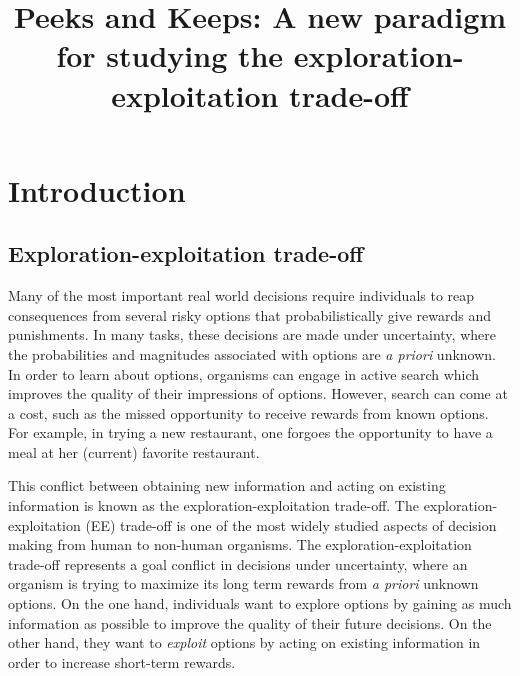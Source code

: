 \documentclass[a4paper,doc,natbib,floatsintext]{apa6}
\title{Peeks and Keeps: A new paradigm for studying the exploration-exploitation trade-off}
\begin{document}
\begin{knitrout}
\color{fgcolor}\begin{kframe}
\begin{alltt}
\hlstd{(} \hlstd{=} \hlstd{)}

 \hlkwb{<-} 
 \hlkwb{<-} 
\end{alltt}
\end{kframe}
\end{knitrout}



\maketitle

\section*{Introduction}

\subsection{Exploration-exploitation trade-off}

Many of the most important real world decisions require individuals to reap consequences from several risky options that probabilistically give rewards and punishments. In many tasks, these decisions are made under uncertainty, where the probabilities and magnitudes associated with options are \textit{a priori} unknown. In order to learn about options, organisms can engage in active search which improves the quality of their impressions of options. However, search can come at a cost, such as the missed opportunity to receive rewards from known options. For example, in trying a new restaurant, one forgoes the opportunity to have a meal at her (current) favorite restaurant.

This conflict between obtaining new information and acting on existing information is known as the exploration-exploitation trade-off. The exploration-exploitation (EE) trade-off is one of the most widely studied aspects of decision making from human to non-human organisms. The exploration-exploitation trade-off represents a goal conflict in decisions under uncertainty, where an organism is trying to maximize its long term rewards from \textit{a priori} unknown options. On the one hand, individuals want to explore options by gaining as much information as possible to improve the quality of their future decisions. On the other hand, they want to \textit{exploit} options by acting on existing information in order to increase short-term rewards.
\end{document}

